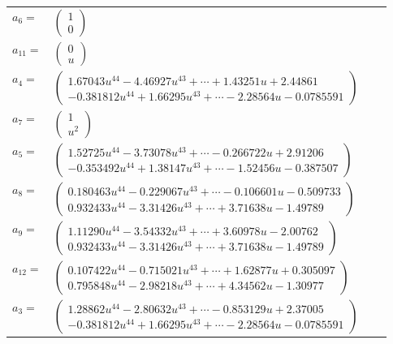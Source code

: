 \documentclass[1p]{elsarticle_modified}
\theoremstyle{definition}
\begin{document}
\begin{tabular}{m{7pt} m{180pt} m{7pt} m{180pt} }
\flushright $a_{6}=$&$\begin{pmatrix}1\\0\end{pmatrix}$ \\
\flushright $a_{11}=$&$\begin{pmatrix}0\\u\end{pmatrix}$ \\
\flushright $a_{4}=$&$\begin{pmatrix}1.67043 u^{44}-4.46927 u^{43}+\cdots+1.43251 u+2.44861\\-0.381812 u^{44}+1.66295 u^{43}+\cdots-2.28564 u-0.0785591\end{pmatrix}$ \\
\flushright $a_{7}=$&$\begin{pmatrix}1\\u^2\end{pmatrix}$ \\
\flushright $a_{5}=$&$\begin{pmatrix}1.52725 u^{44}-3.73078 u^{43}+\cdots-0.266722 u+2.91206\\-0.353492 u^{44}+1.38147 u^{43}+\cdots-1.52456 u-0.387507\end{pmatrix}$ \\
\flushright $a_{8}=$&$\begin{pmatrix}0.180463 u^{44}-0.229067 u^{43}+\cdots-0.106601 u-0.509733\\0.932433 u^{44}-3.31426 u^{43}+\cdots+3.71638 u-1.49789\end{pmatrix}$ \\
\flushright $a_{9}=$&$\begin{pmatrix}1.11290 u^{44}-3.54332 u^{43}+\cdots+3.60978 u-2.00762\\0.932433 u^{44}-3.31426 u^{43}+\cdots+3.71638 u-1.49789\end{pmatrix}$ \\
\flushright $a_{12}=$&$\begin{pmatrix}0.107422 u^{44}-0.715021 u^{43}+\cdots+1.62877 u+0.305097\\0.795848 u^{44}-2.98218 u^{43}+\cdots+4.34562 u-1.30977\end{pmatrix}$ \\
\flushright $a_{3}=$&$\begin{pmatrix}1.28862 u^{44}-2.80632 u^{43}+\cdots-0.853129 u+2.37005\\-0.381812 u^{44}+1.66295 u^{43}+\cdots-2.28564 u-0.0785591\end{pmatrix}$ \\

\end{tabular}
\end{document}
